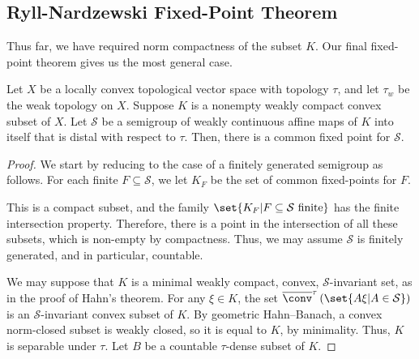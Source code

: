 \documentclass[10pt]{mypackage}
\begin{document}
\subsection{Ryll-Nardzewski Fixed-Point Theorem}%
Thus far, we have required norm compactness of the subset $K$. Our final fixed-point theorem gives us the most general case.
\begin{theorem}
  Let $X$ be a locally convex topological vector space with topology $\tau$, and let $\tau_{w}$ be the weak topology on $X$. Suppose $K$ is a nonempty weakly compact convex subset of $X$. Let $ \mathcal{S} $ be a semigroup of weakly continuous affine maps of $K$ into itself that is distal with respect to $\tau$. Then, there is a common fixed point for $\mathcal{S}$.
\end{theorem}
\begin{proof}
  We start by reducing to the case of a finitely generated semigroup as follows. For each finite $F\subseteq \mathcal{S}$, we let $K_F$ be the set of common fixed-points for $F$.

  This is a compact subset, and the family $\set{K_F | F\subseteq \mathcal{S}\text{ finite}}$ has the finite intersection property. Therefore, there is a point in the intersection of all these subsets, which is non-empty by compactness. Thus, we may assume $\mathcal{S}$ is finitely generated, and in particular, countable.

  We may suppose that $K$ is a minimal weakly compact, convex, $\mathcal{S}$-invariant set, as in the proof of Hahn's theorem. For any $\xi\in K$, the set $ \overline{\conv}^{\tau}\left( \set{A\xi | A\in \mathcal{S}} \right) $ is an $\mathcal{S}$-invariant convex subset of $K$. By geometric Hahn--Banach, a convex norm-closed subset is weakly closed, so it is equal to $ K $, by minimality. Thus, $K$ is separable under $\tau$. Let $B$ be a countable $\tau$-dense subset of $K$.


\end{proof}
\end{document}
